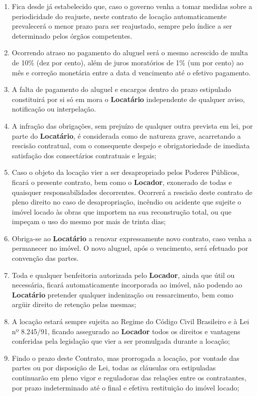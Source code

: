\begin{enumerate}
    \item Fica desde já estabelecido que, caso o governo venha a tomar medidas sobre a periodicidade do reajuste, neste contrato de locação automaticamente prevalecerá o menor prazo para ser reajustado, sempre pelo índice a ser determinado pelos órgãos competentes.
    \item Ocorrendo atraso no pagamento do aluguel será o mesmo acrescido de multa de 10\% (dez por cento), além de juros moratórios de 1\% (um por cento) ao mês e correção monetária entre a data d vencimento até o efetivo pagamento.
    \item A falta de pagamento do aluguel e encargos dentro do prazo estipulado constituirá por si só em mora o \textbf{Locatário} independente de qualquer aviso, notificação ou interpelação.
    \item A infração das obrigações, sem prejuízo de qualquer outra prevista em lei, por parte do \textbf{Locatário}, é considerada como de natureza grave, acarretando a rescisão contratual, com o consequente despejo e obrigatoriedade de imediata satisfação dos consectários contratuais e legais;
    \item Caso o objeto da locação vier a ser desapropriado pelos Poderes Públicos, ficará o presente contrato, bem como o \textbf{Locador}, exonerado de todas e quaisquer responsabilidades decorrentes. Ocorrerá a rescisão deste contrato de pleno direito no caso de desapropriação, incêndio ou acidente que sujeite o imóvel locado às obras que importem na sua reconstrução total, ou que impeçam o uso do mesmo por mais de trinta dias;
    \item Obriga-se ao \textbf{Locatário} a renovar expressamente novo contrato, caso venha a permanecer no imóvel. O novo aluguel, após o vencimento, será efetuado por convenção das partes.
    \item Toda e qualquer benfeitoria autorizada pelo \textbf{Locador}, ainda que útil ou necessária, ficará automaticamente incorporada ao imóvel, não podendo ao \textbf{Locatário} pretender qualquer indenização ou ressarcimento, bem como argüir direito de retenção pelas mesmas;
    \item A locação estará sempre sujeita ao Regime do Código Civil Brasileiro e à Lei nº 8.245/91, ficando assegurado ao \textbf{Locador} todos os direitos e vantagens conferidas pela legislação que vier a ser promulgada durante a locação;
    \item Findo o prazo deste Contrato, mas prorrogada a locação, por vontade das partes ou por disposição de Lei, todas as cláusulas ora estipuladas continuarão em pleno vigor e reguladoras das relações entre os contratantes, por prazo indeterminado até o final e efetiva restituição do imóvel locado;

\end{enumerate}
